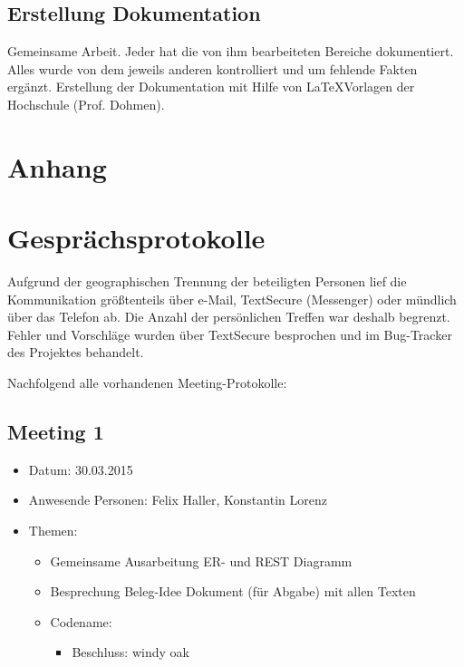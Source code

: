 \documentclass[12pt]{scrartcl}
\begin{document}
		\subsection{Erstellung Dokumentation}
			Gemeinsame Arbeit. Jeder hat die von ihm bearbeiteten Bereiche dokumentiert. Alles wurde von dem jeweils anderen kontrolliert und um fehlende Fakten ergänzt. Erstellung der Dokumentation mit Hilfe von \LaTeX Vorlagen der Hochschule (Prof. Dohmen).
	

	\newpage	
	\appendix
	\setcounter{page}{1}
	\section*{Anhang}
	
	\section{Gesprächsprotokolle}
		Aufgrund der geographischen Trennung der beteiligten Personen lief die Kommunikation größtenteils über e-Mail, TextSecure (Messenger) oder mündlich über das Telefon ab. Die Anzahl der persönlichen Treffen war deshalb begrenzt. Fehler und Vorschläge wurden über TextSecure besprochen und im Bug-Tracker des Projektes behandelt.
		
		Nachfolgend alle vorhandenen Meeting-Protokolle:
		\subsection{Meeting 1}
			\begin{itemize}
				\item Datum: 30.03.2015
				\item Anwesende Personen: Felix Haller, Konstantin Lorenz
				\item Themen:
				\begin{itemize}
					\item Gemeinsame Ausarbeitung ER- und REST Diagramm
					\item Besprechung Beleg-Idee Dokument (für Abgabe) mit allen Texten
					\item Codename:
					\begin{itemize}
						\item Beschluss: windy oak
					\end{itemize}
				\end{itemize}
			\end{itemize}
		
\end{document}
